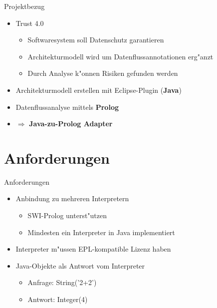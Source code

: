 \documentclass[18pt]{beamer}
\begin{document}
\begin{frame}{Projektbezug}
\begin{itemize}
\item Trust 4.0
\begin{itemize}
\item Softwaresystem soll Datenschutz garantieren
\item Architekturmodell wird um Datenflussannotationen erg"anzt
\item Durch Analyse k"onnen Risiken gefunden werden
\end{itemize}
\vspace{0.5cm}
\item Architekturmodell erstellen mit Eclipse-Plugin (\textbf{Java})
\item Datenflussanalyse mittels \textbf{Prolog}
\vspace{0.5cm}
\item[] $\Rightarrow$ \textbf{Java-zu-Prolog Adapter}
\end{itemize}
\end{frame}

\section{Anforderungen}
\begin{frame}{Anforderungen}
\begin{itemize}
\item Anbindung zu mehreren Interpretern
\begin{itemize}
\item SWI-Prolog unterst"utzen
\item Mindesten ein Interpreter in Java implementiert
\end{itemize}
\vspace{0.3cm}
\item Interpreter m"ussen EPL-kompatible Lizenz haben
\vspace{0.3cm}
\item Java-Objekte als Antwort vom Interpreter
\begin{itemize}
\item Anfrage: String('2+2')
\item Antwort: Integer(4)
\end{itemize}
\end{itemize}
\end{frame}
\end{document}
